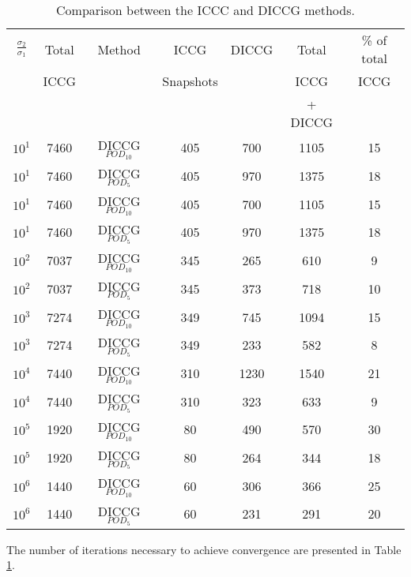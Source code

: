 \documentclass[12pt]{article}
\begin{document}
\begin{table}[!ht]\centering
\begin{minipage}{1\textwidth}
 \centering
\begin{tabular}{ ||c|c||c|c|c|c|c||} 
\hline
$\frac{\sigma_2}{\sigma_1}$&Total&Method  & ICCG&DICCG &Total&\% of total\\ 
                           & ICCG     &  & Snapshots& &ICCG& ICCG\\ 
                                    &    &  & & &+ DICCG& \\                   
\hline  
$10^{1}$ &7460& DICCG$_{POD_{10}}$&405&700&1105&15 \\ 
\hline  
$10^{1}$ &7460& DICCG$_{POD_{5}}$&405&970&1375&18 \\ 
\hline  
$10^{1}$ &7460& DICCG$_{POD_{10}}$&405&700&1105&15 \\ 
\hline  
$10^{1}$ &7460& DICCG$_{POD_{5}}$&405&970&1375&18 \\ 
\hline  
$10^{2}$ &7037& DICCG$_{POD_{10}}$&345&265&610&9 \\ 
\hline  
$10^{2}$ &7037& DICCG$_{POD_{5}}$&345&373&718&10 \\ 
\hline   
$10^{3}$ &7274& DICCG$_{POD_{10}}$&349&745&1094&15 \\ 
\hline  
$10^{3}$ &7274& DICCG$_{POD_{5}}$&349&233&582&8 \\ 
\hline  
$10^{4}$ &7440& DICCG$_{POD_{10}}$&310&1230&1540&21 \\ 
\hline  
$10^{4}$ &7440& DICCG$_{POD_{5}}$&310&323&633&9 \\ 
\hline 
$10^{5}$ &1920& DICCG$_{POD_{10}}$&80&490&570&30 \\ 
\hline  
$10^{5}$ &1920& DICCG$_{POD_{5}}$&80&264&344&18 \\ 
\hline 
$10^{6}$ &1440& DICCG$_{POD_{10}}$&60&306&366&25 \\ 
\hline  
$10^{6}$ &1440& DICCG$_{POD_{5}}$&60&231&291&20 \\ 
\hline   
\end{tabular} 
\caption{Comparison between the ICCC and DICCG methods.}\label{table:litertotw1} 
\end{minipage}  
\end{table} 

The number of iterations necessary to achieve convergence are presented in Table \ref{table:litertotw1}. \\\\
\end{document}
